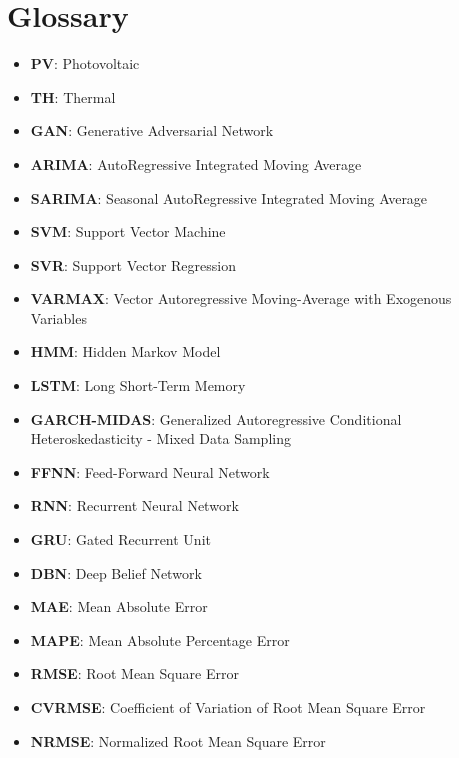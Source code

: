 \section*{Glossary}
\label{sec:glossary} 


\begin{itemize}

    \item \textbf{PV}: Photovoltaic

    \item \textbf{TH}: Thermal

    \item \textbf{GAN}: Generative Adversarial Network

    \item \textbf{ARIMA}: AutoRegressive Integrated Moving Average

    \item \textbf{SARIMA}: Seasonal AutoRegressive Integrated Moving Average

    \item \textbf{SVM}: Support Vector Machine

    \item \textbf{SVR}: Support Vector Regression

    \item \textbf{VARMAX}: Vector Autoregressive Moving-Average with Exogenous Variables

    \item \textbf{HMM}: Hidden Markov Model

    \item \textbf{LSTM}: Long Short-Term Memory

    \item \textbf{GARCH-MIDAS}: Generalized Autoregressive Conditional Heteroskedasticity - Mixed Data Sampling

    \item \textbf{FFNN}: Feed-Forward Neural Network

    \item \textbf{RNN}: Recurrent Neural Network

    \item \textbf{GRU}: Gated Recurrent Unit

    \item \textbf{DBN}: Deep Belief Network

    \item \textbf{MAE}: Mean Absolute Error

    \item \textbf{MAPE}: Mean Absolute Percentage Error

    \item \textbf{RMSE}: Root Mean Square Error

    \item \textbf{CVRMSE}: Coefficient of Variation of Root Mean Square Error

    \item \textbf{NRMSE}: Normalized Root Mean Square Error

\end{itemize}


